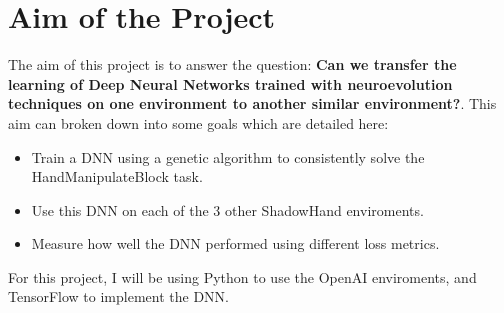 \section{Aim of the Project}

The aim of this project is to answer the question: \textbf{Can we transfer the learning of Deep Neural Networks trained with neuroevolution techniques on one environment to another similar environment?}. This aim can broken down into some goals which are detailed here:
\begin{itemize}
  \item Train a DNN using a genetic algorithm to consistently solve the HandManipulateBlock task.
  \item Use this DNN on each of the 3 other ShadowHand enviroments.
  \item Measure how well the DNN performed using different loss metrics.
\end{itemize}

For this project, I will be using Python to use the OpenAI enviroments, and TensorFlow to implement the DNN.
